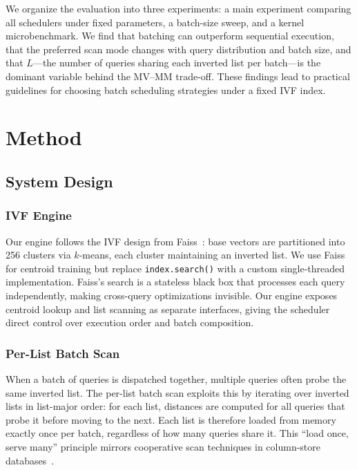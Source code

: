 \documentclass[sigconf, nonacm]{acmart}
\begin{document}
We organize the evaluation into three experiments: a main experiment
comparing all schedulers under fixed parameters, a batch-size sweep, and
a kernel microbenchmark. We find that batching can outperform
sequential execution, that the preferred scan mode changes with query
distribution and batch size, and that $L$---the number of queries
sharing each inverted list per batch---is the dominant variable behind
the MV--MM trade-off. These findings lead to practical guidelines for
choosing batch scheduling strategies under a fixed IVF index.

\section{Method}

\subsection{System Design}

\subsubsection{IVF Engine}

Our engine follows the IVF design from Faiss~\cite{faiss2021}: base
vectors are partitioned into 256 clusters via $k$-means, each cluster
maintaining an inverted list. We use Faiss for centroid training but
replace \texttt{index.search()} with a custom single-threaded implementation.
Faiss's search is a stateless black box that processes each query
independently, making cross-query optimizations invisible. Our engine
exposes centroid lookup and list scanning as separate interfaces, giving
the scheduler direct control over execution order and batch composition.

\subsubsection{Per-List Batch Scan}

When a batch of queries is dispatched together, multiple queries often
probe the same inverted list. The per-list batch scan exploits this by
iterating over inverted lists in list-major order: for each list,
distances are computed for all queries that probe it before moving to
the next. Each list is therefore loaded from memory exactly once per
batch, regardless of how many queries share it. This ``load once, serve
many'' principle mirrors cooperative scan techniques in column-store
databases~\cite{coopscans2007}.
\end{document}
